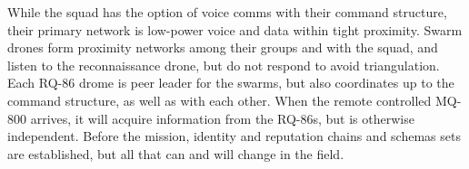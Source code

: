 While the squad has the option of voice comms with their command structure, their primary network is low-power voice and data within tight proximity.
Swarm drones form proximity networks among their groups and with the squad, and listen to the reconnaissance drone, but do not respond to avoid triangulation.
Each RQ-86 drome is peer leader for the swarms, but also coordinates up to the command structure, as well as with each other.
When the remote controlled MQ-800 arrives, it will acquire information from the RQ-86s, but is otherwise independent.
Before the mission, identity and reputation chains and schemas sets are established, but all that can and will change in the field.
